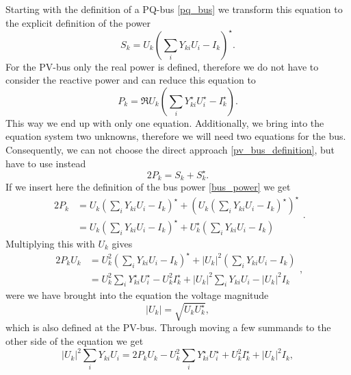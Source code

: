 Starting with the definition of a PQ-bus \eqref{pq_bus} we transform this equation to the explicit definition of the power
\begin{equation}
	S_k = U_k \left( \sum_i Y_{ki} U_i - I_k \right)^\star.
	\label{eq:bus_power}
\end{equation}
For the PV-bus only the real power is defined, therefore we do not have to consider the reactive power and can reduce this equation to
\begin{equation}
	P_k = \Re{U_k \left( \sum_i Y_{ki}^\star U_i^\star - I_k^\star \right)}.
	\label{eq:pv_bus_definition}
\end{equation}
This way we end up with only one equation. Additionally, we bring into the equation system two unknowns, therefore we will need two equations for the bus. Consequently, we can not choose the direct approach \eqref{pv_bus_definition}, but have to use instead
\begin{equation}
	2 P_k = S_k + S_k^\star.
\end{equation}
If we insert here the definition of the bus power \eqref{bus_power} we get
\begin{equation}
	\begin{split}
		2 P_k 	& = U_k \left( \sum_i Y_{ki} U_i - I_k \right)^\star + \left( U_k \left( \sum_i Y_{ki} U_i - I_k \right)^\star \right)^\star \\
				& = U_k \left( \sum_i Y_{ki} U_i - I_k \right)^\star + U_k^\star \left( \sum_i Y_{ki} U_i - I_k \right)
	\end{split}.
\end{equation}
Multiplying this with $U_k$ gives
\begin{equation}
	\begin{split}
		2 P_k U_k 	& = U_k^2 \left( \sum_i Y_{ki} U_i - I_k \right)^\star + |U_k|^2 \left( \sum_i Y_{ki} U_i - I_k \right) \\
					& = U_k^2 \sum_i Y_{ki}^\star U_i^\star - U_k^2 I_k^\star + |U_k|^2 \sum_i Y_{ki} U_i - |U_k|^2 I_k
	\end{split},
\end{equation}
were we have brought into the equation the voltage magnitude 
\begin{equation}
	|U_k| = \sqrt{U_k U_k^\star},
\end{equation}
which is also defined at the PV-bus. Through moving a few summands to the other side of the equation we get
\begin{equation}
	|U_k|^2 \sum_i Y_{ki} U_i = 2 P_k U_k - U_k^2 \sum_i Y_{ki}^\star U_i^\star + U_k^2 I_k^\star + |U_k|^2 I_k,
\end{equation}
